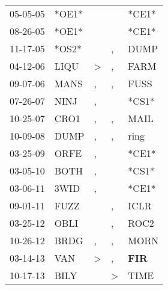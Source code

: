 \begin{supertabular}{p{0.07\textwidth}p{0.06\textwidth}p{0.02\textwidth}p{0.02\textwidth}p{0.06\textwidth}}
 05-05-05\textsuperscript{} &                            *OE1* &               &               &                           *CE1* \\
 08-26-05\textsuperscript{} &                            *OE1* &               &               &                           *CE1* \\
 11-17-05\textsuperscript{} &                            *OS2* &               &             , &          DUMP\textsuperscript{} \\
 04-12-06\textsuperscript{} &           LIQU\textsuperscript{} &  \textgreater &             , &          FARM\textsuperscript{} \\
 09-07-06\textsuperscript{} &           MANS\textsuperscript{} &             , &             , &          FUSS\textsuperscript{} \\
 07-26-07\textsuperscript{} &           NINJ\textsuperscript{} &             , &               &                           *CS1* \\
 10-25-07\textsuperscript{} &           CRO1\textsuperscript{} &             , &             , &          MAIL\textsuperscript{} \\
 10-09-08\textsuperscript{} &           DUMP\textsuperscript{} &             , &             , &          ring\textsuperscript{} \\
 03-25-09\textsuperscript{} &           ORFE\textsuperscript{} &             , &               &                           *CE1* \\
 03-05-10\textsuperscript{} &           BOTH\textsuperscript{} &             , &               &                           *CS1* \\
 03-06-11\textsuperscript{} &           3WID\textsuperscript{} &             , &               &                           *CE1* \\
 09-01-11\textsuperscript{} &           FUZZ\textsuperscript{} &               &             , &          ICLR\textsuperscript{} \\
 03-25-12\textsuperscript{} &           OBLI\textsuperscript{} &               &             , &          ROC2\textsuperscript{} \\
 10-26-12\textsuperscript{} &           BRDG\textsuperscript{} &             , &             , &          MORN\textsuperscript{} \\
 03-14-13\textsuperscript{} &            VAN\textsuperscript{} &  \textgreater &             , &  \textbf{FIR\textsuperscript{}} \\
 10-17-13\textsuperscript{} &           BILY\textsuperscript{} &               &  \textgreater &          TIME\textsuperscript{} \\

\end{supertabular}
